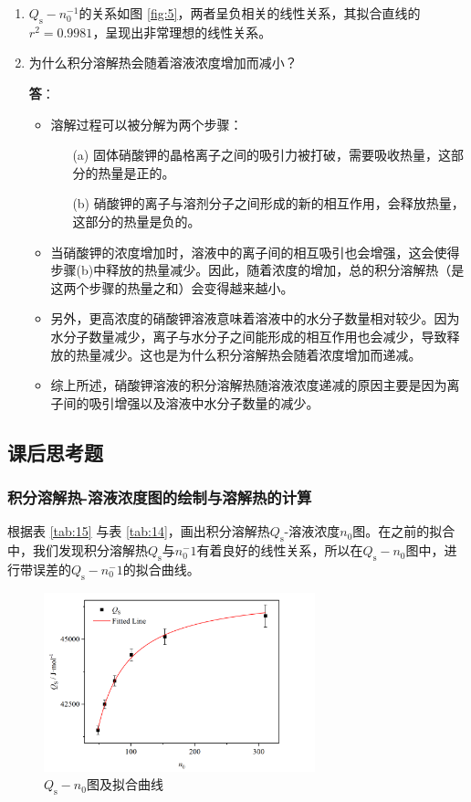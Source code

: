 \documentclass[cn,hazy,pku,12pt,normal,math=newtx,cite=super]{elegantnote}
\begin{document}
\begin{enumerate}
    \item $Q_{\mathrm{s}}-n_0^{-1}$的关系如图 \ref{fig:5}，两者呈负相关的线性关系，其拟合直线的$r^2 = 0.9981$，呈现出非常理想的线性关系。
    \item 为什么积分溶解热会随着溶液浓度增加而减小？
    
    \textbf{答}：
    \begin{itemize}
        \item 溶解过程可以被分解为两个步骤：
        \begin{enumerate}
            \item[(a)] 固体硝酸钾的晶格离子之间的吸引力被打破，需要吸收热量，这部分的热量是正的。
            \item[(b)] 硝酸钾的离子与溶剂分子之间形成的新的相互作用，会释放热量，这部分的热量是负的。
        \end{enumerate}
        \item 当硝酸钾的浓度增加时，溶液中的离子间的相互吸引也会增强，这会使得步骤(b)中释放的热量减少。因此，随着浓度的增加，总的积分溶解热（是这两个步骤的热量之和）会变得越来越小。
        \item 另外，更高浓度的硝酸钾溶液意味着溶液中的水分子数量相对较少。因为水分子数量减少，离子与水分子之间能形成的相互作用也会减少，导致释放的热量减少。这也是为什么积分溶解热会随着浓度增加而递减。
        \item 综上所述，硝酸钾溶液的积分溶解热随溶液浓度递减的原因主要是因为离子间的吸引增强以及溶液中水分子数量的减少。
    \end{itemize}
\end{enumerate}
\subsection{课后思考题}

\subsubsection{积分溶解热-溶液浓度图的绘制与溶解热的计算}

根据表 \ref{tab:15} 与表 \ref{tab:14}，画出积分溶解热$Q_{\mathrm{s}}$-溶液浓度$n_0$图。在之前的拟合中，我们发现积分溶解热$Q_{\mathrm{s}}$与$n_0^-1$有着良好的线性关系，所以在$Q_{\mathrm{s}}-n_0$图中，进行带误差的$Q_{\mathrm{s}}-n_0^-1$的拟合曲线。

\begin{figure}[htbp]
    \centering
    \includegraphics[width=0.7\textwidth]{figures/5-1.png}
    \caption{$Q_{\mathrm{s}}-n_0$图及拟合曲线}
    \label{fig:6}
\end{figure}
\end{document}
